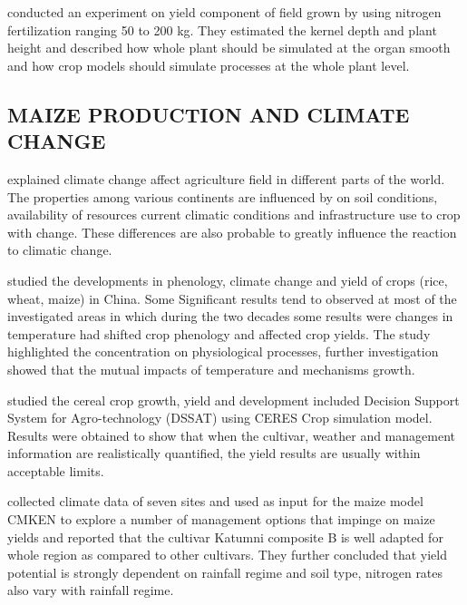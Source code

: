   \citet{Ogunlela1988} conducted an experiment on yield component of field grown by using nitrogen fertilization ranging 50 to 200 kg. They estimated the kernel depth and plant height and described how whole plant should be simulated at the organ smooth and how crop models should simulate processes at the whole plant level.
\subsection{MAIZE PRODUCTION AND CLIMATE CHANGE}
  \citet{Parry2000} explained climate change affect agriculture field in different parts of the world. The properties among various continents are influenced by on soil conditions, availability of resources current climatic conditions and infrastructure use to crop with change. These differences are also probable to greatly influence the reaction to climatic change.     

 \citet{Tao2006} studied the developments in phenology, climate change and yield of crops (rice, wheat, maize) in China. Some Significant results tend to observed at most of the investigated areas in which during the two decades some results were changes in temperature had shifted crop phenology and affected crop yields. The study highlighted the concentration on physiological processes, further investigation showed that the mutual impacts of temperature and mechanisms growth.  

 \citet{Ritchie1998} studied the cereal crop growth, yield and development included Decision Support System for Agro-technology (DSSAT) using CERES Crop simulation model. Results were obtained to show that when the cultivar, weather and management information are realistically quantified, the yield results are usually within acceptable limits.

 \citet{Probert2001} collected climate data of seven sites and used as input for the maize model CMKEN to explore a number of management options that impinge on maize yields and reported that the cultivar Katumni composite B is well adapted for whole region as compared to other cultivars. They further concluded that yield potential is strongly dependent on rainfall regime and soil type, nitrogen rates also vary with rainfall regime.


